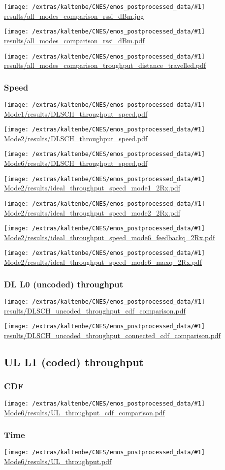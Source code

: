 \documentclass[a4paper,10pt]{article}
\newcommand{\printfile}[1]{
 \begin{minipage}{8cm}
  \centering
  \texttt{[image: /extras/kaltenbe/CNES/emos\_postprocessed\_data/\#1]}
  \url{#1}

 \end{minipage}
}
\begin{document}
\printfile{results/all_modes_comparison_rssi_dBm.jpg}
\printfile{results/all_modes_comparison_rssi_dBm.pdf}
\printfile{results/all_modes_comparison_troughput_distance_travelled.pdf}

\subsubsection{Speed}

\printfile{Mode1/results/DLSCH_throughput_speed.pdf}
\printfile{Mode2/results/DLSCH_throughput_speed.pdf}
\printfile{Mode6/results/DLSCH_throughput_speed.pdf}


\printfile{Mode2/results/ideal_throughput_speed_mode1_2Rx.pdf}
%
\printfile{Mode2/results/ideal_throughput_speed_mode2_2Rx.pdf}

\printfile{Mode2/results/ideal_throughput_speed_mode6_feedbackq_2Rx.pdf}
%
\printfile{Mode2/results/ideal_throughput_speed_mode6_maxq_2Rx.pdf}

\subsubsection{DL L0 (uncoded) throughput}

\printfile{results/DLSCH_uncoded_throughput_cdf_comparison.pdf}
\printfile{results/DLSCH_uncoded_throughput_connected_cdf_comparison.pdf}

\subsection{UL L1 (coded) throughput}

\subsubsection{CDF}
\printfile{Mode6/results/UL_throughput_cdf_comparison.pdf}

\subsubsection{Time}
\printfile{Mode6/results/UL_throughput.pdf}
\end{document}
